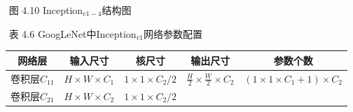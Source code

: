 ​ 图 4.10 Inception\(_{v1-4}\)结构图

​ 表 4.6 GoogLeNet中Inception\(_{v1}\)网络参数配置

\begin{longtable}[]{ ccccc }
\toprule
\begin{minipage}[b]{0.16\columnwidth}\centering\strut
网络层\strut
\end{minipage} & \begin{minipage}[b]{0.15\columnwidth}\centering\strut
输入尺寸\strut
\end{minipage} & \begin{minipage}[b]{0.17\columnwidth}\centering\strut
核尺寸\strut
\end{minipage} & \begin{minipage}[b]{0.16\columnwidth}\centering\strut
输出尺寸\strut
\end{minipage} & \begin{minipage}[b]{0.22\columnwidth}\centering\strut
参数个数\strut
\end{minipage}\tabularnewline
\midrule
\endhead
\begin{minipage}[t]{0.16\columnwidth}\centering\strut
卷积层\(C_{11}\)\strut
\end{minipage} & \begin{minipage}[t]{0.15\columnwidth}\centering\strut
\(H\times{W}\times{C_1}\)\strut
\end{minipage} & \begin{minipage}[t]{0.17\columnwidth}\centering\strut
\(1\times1\times{C_2}/2\)\strut
\end{minipage} & \begin{minipage}[t]{0.16\columnwidth}\centering\strut
\(\frac{H}{2}\times\frac{W}{2}\times{C_2}\)\strut
\end{minipage} & \begin{minipage}[t]{0.22\columnwidth}\centering\strut
\((1\times1\times{C_1}+1)\times{C_2}\)\strut
\end{minipage}\tabularnewline
\begin{minipage}[t]{0.16\columnwidth}\centering\strut
卷积层\(C_{21}\)\strut
\end{minipage} & \begin{minipage}[t]{0.15\columnwidth}\centering\strut
\(H\times{W}\times{C_2}\)\strut
\end{minipage} & \begin{minipage}[t]{0.17\columnwidth}\centering\strut
\(1\times1\times{C_2}/2\)\strut
\end{minipage} & \begin{minipage}[t]{0.16\columnwidth}\centering\strut

\end{minipage}
\end{longtable}
